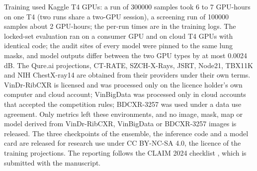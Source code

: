 Training used Kaggle T4 GPUs: a run of \num{300000} samples took 6 to 7 GPU-hours on one T4 (two runs share a two-GPU session), a screening run
of \num{100000} samples about 2 GPU-hours; the per-run times are in the training logs. The locked-set evaluation ran on a consumer GPU and on
cloud T4 GPUs with identical code; the audit sites of every model were pinned to the same lung masks, and model outputs differ between the two
GPU types by at most 0.0024\,dB.
The Qure.ai projections, CT-RATE, SZCH-X-Rays, JSRT, Node21, TBX11K and NIH ChestX-ray14 are obtained from their providers under their own terms.
VinDr-RibCXR is licensed and was processed only on the licence holder's own computer and cloud account; VinBigData was processed only in
cloud accounts that accepted the competition rules; BDCXR-3257 was used under a data use agreement. Only metrics left these environments, and no
image, mask, map or model derived from VinDr-RibCXR, VinBigData or BDCXR-3257 images is released.
The three checkpoints of the ensemble, the inference code and a model card are released for research use under CC BY-NC-SA 4.0, the licence of the
training projections. 
The reporting follows the CLAIM 2024 checklist \citep{tejani2024claim}, which is submitted with the manuscript.
